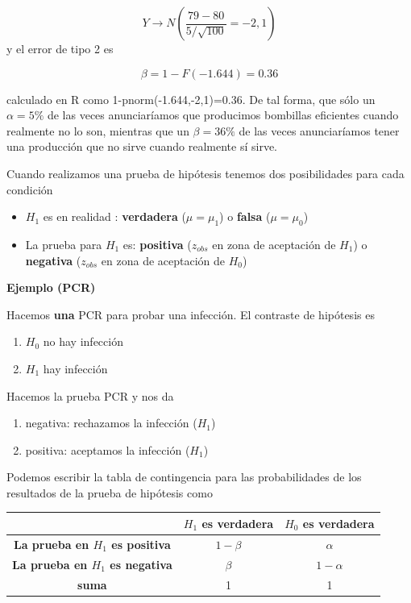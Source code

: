 \documentclass[
]{book}
\providecommand{\tightlist}{%
  \setlength{\itemsep}{0pt}\setlength{\parskip}{0pt}}
\begin{document}
\[Y \rightarrow N(\frac{79-80}{5/\sqrt{100}}=-2,1)\] y el error de tipo 2 es

\[\beta = 1-F(-1.644)=0.36\]

calculado en R como 1-pnorm(-1.644,-2,1)=0.36. De tal forma, que sólo un \(\alpha=5\%\) de las veces anunciaríamos que producimos bombillas eficientes cuando realmente no lo son, mientras que un \(\beta=36\%\) de las veces anunciaríamos tener una producción que no sirve cuando realmente sí sirve.

Cuando realizamos una prueba de hipótesis tenemos dos posibilidades para cada condición

\begin{itemize}
\tightlist
\item
  \(H_1\) es en realidad : \textbf{verdadera} (\(\mu=\mu_1\)) o \textbf{falsa} (\(\mu=\mu_0\))
\item
  La prueba para \(H_1\) es: \textbf{positiva} (\(z_{obs}\) en zona de aceptación de \(H_1\)) o \textbf{negativa} (\(z_{obs}\) en zona de aceptación de \(H_0\))
\end{itemize}

\textbf{Ejemplo (PCR)}

Hacemos \textbf{una} PCR para probar una infección. El contraste de hipótesis es

\begin{enumerate}
\def\labelenumi{\alph{enumi}.}
\tightlist
\item
  \(H_0\) no hay infección
\item
  \(H_1\) hay infección
\end{enumerate}

Hacemos la prueba PCR y nos da

\begin{enumerate}
\def\labelenumi{\roman{enumi}.}
\tightlist
\item
  negativa: rechazamos la infección (\(H_1\))
\item
  positiva: aceptamos la infección (\(H_1\))
\end{enumerate}

Podemos escribir la tabla de contingencia para las probabilidades de los resultados de la prueba de hipótesis como

\begin{longtable}[]{@{}ccc@{}}
\toprule\noalign{}
& \(H_1\) es verdadera & \(H_0\) es verdadera \\
\midrule\noalign{}
\endhead
\bottomrule\noalign{}
\endlastfoot
\textbf{La prueba en \(H_1\) es positiva} & \(1-\beta\) & \(\alpha\) \\
\textbf{La prueba en \(H_1\) es negativa} & \(\beta\) & \(1-\alpha\) \\
\textbf{suma} & 1 & 1 \\
\end{longtable}
\end{document}
